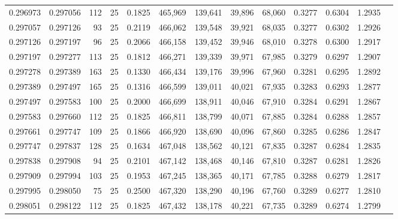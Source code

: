 \begin{tabular}{rrrrrrrrrrrrr}
0.296973 & 0.297056 &   112 &  25 &                                     0.1825 & 465,969 & 139,641 &  39,896 &  68,060 & 0.3277 & 0.6304 & 1.2935 \\
0.297057 & 0.297126 &    93 &  25 &                                     0.2119 & 466,062 & 139,548 &  39,921 &  68,035 & 0.3277 & 0.6302 & 1.2926 \\
0.297126 & 0.297197 &    96 &  25 &                                     0.2066 & 466,158 & 139,452 &  39,946 &  68,010 & 0.3278 & 0.6300 & 1.2917 \\
0.297197 & 0.297277 &   113 &  25 &                                     0.1812 & 466,271 & 139,339 &  39,971 &  67,985 & 0.3279 & 0.6297 & 1.2907 \\
0.297278 & 0.297389 &   163 &  25 &                                     0.1330 & 466,434 & 139,176 &  39,996 &  67,960 & 0.3281 & 0.6295 & 1.2892 \\
0.297389 & 0.297497 &   165 &  25 &                                     0.1316 & 466,599 & 139,011 &  40,021 &  67,935 & 0.3283 & 0.6293 & 1.2877 \\
0.297497 & 0.297583 &   100 &  25 &                                     0.2000 & 466,699 & 138,911 &  40,046 &  67,910 & 0.3284 & 0.6291 & 1.2867 \\
0.297583 & 0.297660 &   112 &  25 &                                     0.1825 & 466,811 & 138,799 &  40,071 &  67,885 & 0.3284 & 0.6288 & 1.2857 \\
0.297661 & 0.297747 &   109 &  25 &                                     0.1866 & 466,920 & 138,690 &  40,096 &  67,860 & 0.3285 & 0.6286 & 1.2847 \\
0.297747 & 0.297837 &   128 &  25 &                                     0.1634 & 467,048 & 138,562 &  40,121 &  67,835 & 0.3287 & 0.6284 & 1.2835 \\
0.297838 & 0.297908 &    94 &  25 &                                     0.2101 & 467,142 & 138,468 &  40,146 &  67,810 & 0.3287 & 0.6281 & 1.2826 \\
0.297909 & 0.297994 &   103 &  25 &                                     0.1953 & 467,245 & 138,365 &  40,171 &  67,785 & 0.3288 & 0.6279 & 1.2817 \\
0.297995 & 0.298050 &    75 &  25 &                                     0.2500 & 467,320 & 138,290 &  40,196 &  67,760 & 0.3289 & 0.6277 & 1.2810 \\
0.298051 & 0.298122 &   112 &  25 &                                     0.1825 & 467,432 & 138,178 &  40,221 &  67,735 & 0.3289 & 0.6274 & 1.2799 \\

\end{tabular}
